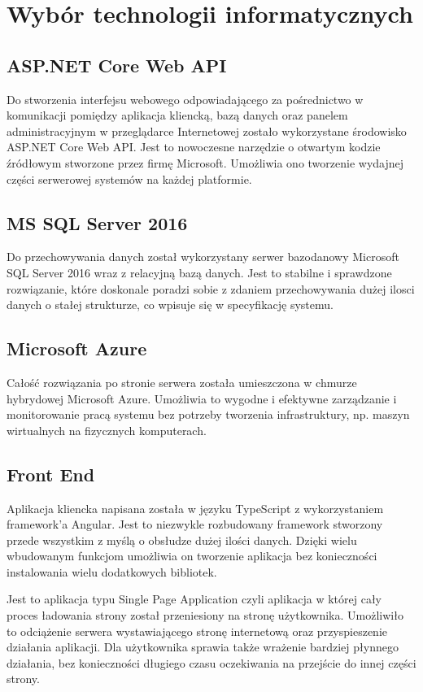 \newpage\section{Wybór technologii informatycznych} \label{sec:technologie}
\subsection{ASP.NET Core Web API}
Do stworzenia interfejsu webowego odpowiadającego za pośrednictwo w komunikacji pomiędzy aplikacja kliencką, bazą danych oraz panelem administracyjnym w przeglądarce Internetowej zostało wykorzystane środowisko ASP.NET Core Web API. Jest to nowoczesne narzędzie o otwartym kodzie źródłowym stworzone przez firmę Microsoft. Umożliwia ono tworzenie wydajnej części serwerowej systemów na każdej platformie.

\subsection{MS SQL Server 2016}
Do przechowywania danych został wykorzystany serwer bazodanowy Microsoft SQL Server 2016 wraz z relacyjną bazą danych. Jest to stabilne i sprawdzone rozwiązanie, które doskonale poradzi sobie z zdaniem przechowywania dużej ilosci danych o stałej strukturze, co wpisuje się w specyfikację systemu.

\subsection{Microsoft Azure}
Całość rozwiązania po stronie serwera została umieszczona w chmurze hybrydowej Microsoft Azure. Umożliwia to wygodne i efektywne zarządzanie i monitorowanie pracą systemu bez potrzeby tworzenia infrastruktury, np. maszyn wirtualnych na fizycznych komputerach.

\subsection{Front End}
Aplikacja kliencka napisana została w języku TypeScript z wykorzystaniem framework'a Angular. Jest to niezwykle rozbudowany framework stworzony przede wszystkim z myślą o obsłudze dużej ilości danych. Dzięki wielu wbudowanym funkcjom umożliwia on tworzenie aplikacja bez konieczności instalowania wielu dodatkowych bibliotek. 

Jest to aplikacja typu Single Page Application czyli aplikacja w której cały proces ładowania strony został przeniesiony na stronę użytkownika. Umożliwiło to odciążenie serwera wystawiającego stronę internetową oraz przyspieszenie działania aplikacji. Dla użytkownika sprawia także wrażenie bardziej płynnego działania, bez konieczności długiego czasu oczekiwania na przejście do innej części strony.

